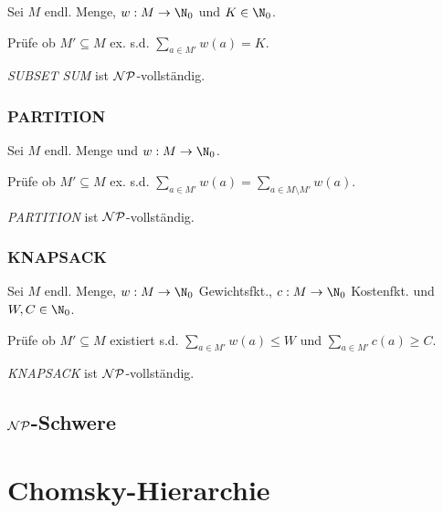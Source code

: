 Sei $M$ endl. Menge, $w : M \to \N_0$ und $K \in \N_0$.

Prüfe ob $M' \subseteq M$ ex. s.d. $\sum_{a \in M'} w(a) = K$.

\emph{SUBSET SUM} ist $\mathcal{NP}$-vollständig.

\subsubsection*{PARTITION}

Sei $M$ endl. Menge und $w : M \to \N_0$.

Prüfe ob $M' \subseteq M$ ex. s.d. $\textstyle\sum\limits_{a \in M'} w(a) = \textstyle\sum\limits_{a \in M \setminus M'} w(a)$.

\emph{PARTITION} ist $\mathcal{NP}$-vollständig.

\subsubsection*{KNAPSACK}

Sei $M$ endl. Menge, $w : M \to \N_0$ Gewichtsfkt., $c : M \to \N_0$ Kostenfkt. und $W,C \in \N_0$.

Prüfe ob $M' \subseteq M$ existiert s.d. $\sum_{a \in M'} w(a) \leq W$ und $\sum_{a \in M'} c(a) \geq C$.

\emph{KNAPSACK} ist $\mathcal{NP}$-vollständig.

\subsection*{$\mathcal{NP}$-Schwere}

\section*{Chomsky-Hierarchie}

